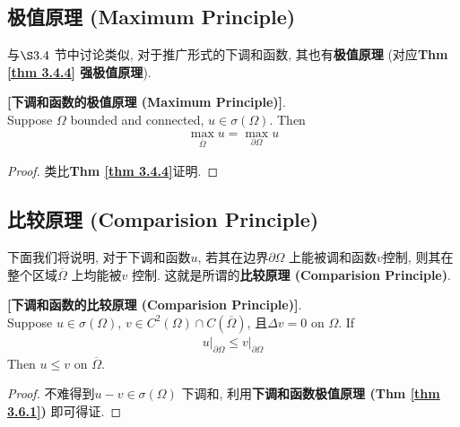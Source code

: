 \newpage

\subsection{极值原理 (Maximum Principle)}
	与$\S 3.4$ 节中讨论类似, 对于推广形式的下调和函数, 其也有\textbf{极值原理} (对应\textbf{Thm \ref{thm 3.4.4} 强极值原理}). 
	
	\vspace*{1em}
	
	\begin{thm}\label{thm 3.6.1}
		\textbf{[下调和函数的极值原理 (Maximum Principle)]}. \\
		Suppose $\Omega$ bounded and connected, $u \in \sigma(\Omega)$. Then 
		\begin{align*}
			\max_{\overline{\Omega}} u = \max_{\partial \Omega} u
		\end{align*}
		
		\vspace*{1em}
		
		\begin{proof}
			类比\textbf{Thm \ref{thm 3.4.4}}证明. 
		\end{proof}
	\end{thm}

\vspace*{3.5em}

\subsection{比较原理 (Comparision Principle)}
	下面我们将说明, 对于下调和函数$u$, 若其在边界$\partial \Omega$ 上能被调和函数$v$控制, 则其在整个区域$\overline{\Omega}$ 上均能被$v$ 控制. 这就是所谓的\textbf{比较原理 (Comparision Principle)}. 
	
	\vspace*{1em}
	
	\begin{thm}\label{thm 3.6.2}
		\textbf{[下调和函数的比较原理 (Comparision Principle)]}. \\
		Suppose $u \in \sigma(\Omega)$, $v \in C^2(\Omega) \cap C \left( \overline{\Omega} \right)$, 且$\Delta v = 0$ on $\Omega$. If
		\begin{align*}
			u \Big|_{\partial \Omega} \leq v \Big|_{\partial \Omega}
		\end{align*}
		Then $u \leq v$ on $\overline{\Omega}$. 
		
		\vspace*{1em}
		
		\begin{proof}
			不难得到$u - v \in \sigma(\Omega)$ 下调和, 利用\textbf{下调和函数极值原理 (Thm \ref{thm 3.6.1})} 即可得证. 
		\end{proof}
	\end{thm}

